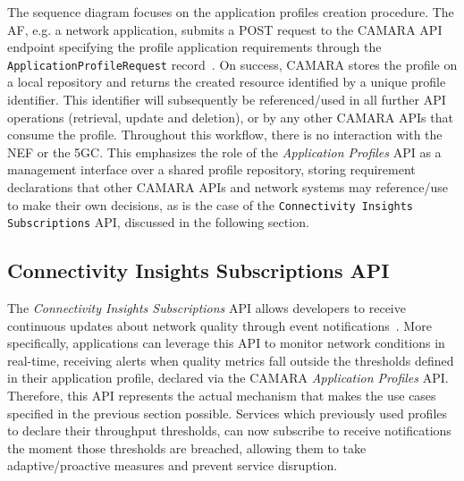 The sequence diagram focuses on the application profiles creation procedure. The \acs{AF}, e.g. a network application, submits a POST request to the CAMARA \acs{API} endpoint specifying the profile application requirements through the \texttt{ApplicationProfileRequest} record~\cite{CAMARAApplicationProfilesRelease}. On success, CAMARA stores the profile on a local repository and returns the created resource identified by a unique profile identifier. This identifier will subsequently be referenced/used in all further \acs{API} operations (retrieval, update and deletion), or by any other CAMARA \acsp{API} that consume the profile. Throughout this workflow, there is no interaction with the \acs{NEF} or the \acs{5GC}. This emphasizes the role of the \textit{Application Profiles} \acs{API} as a management interface over a shared profile repository, storing requirement declarations that other CAMARA \acsp{API} and network systems may reference/use to make their own decisions, as is the case of the \texttt{Connectivity Insights Subscriptions} \acs{API}, discussed in the following section.

\subsection{Connectivity Insights Subscriptions \acs{API}}

The \textit{Connectivity Insights Subscriptions} \acs{API} allows developers to receive continuous updates about network quality through event notifications~\cite{CAMARAConnectivityInsightsSubscriptions}. More specifically, applications can leverage this \acs{API} to monitor network conditions in real-time, receiving alerts when quality metrics fall outside the thresholds defined in their application profile, declared via the CAMARA \textit{Application Profiles} API. Therefore, this \acs{API} represents the actual mechanism that makes the use cases specified in the previous section possible. Services which previously used profiles to declare their throughput thresholds, can now subscribe to receive notifications the moment those thresholds are breached, allowing them to take adaptive/proactive measures and prevent service disruption.

